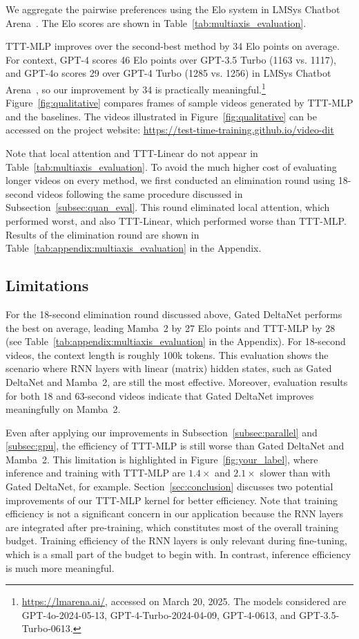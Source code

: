 We aggregate the pairwise preferences using the Elo system in LMSys Chatbot Arena~\cite{chiang2024chatbot}.
The Elo scores are shown in Table~\ref{tab:multiaxis_evaluation}.

TTT-MLP improves over the second-best method by 34 Elo points on average. 
For context, GPT-4 scores 46 Elo points over GPT-3.5 Turbo (1163 vs. 1117), and GPT-4o scores 29 over GPT-4 Turbo (1285 vs. 1256) in LMSys Chatbot Arena~\cite{chiang2024chatbot}, so our improvement by 34 is practically meaningful.\footnote{
\url{https://lmarena.ai/}, accessed on March 20, 2025. The models considered are
GPT-4o-2024-05-13,
GPT-4-Turbo-2024-04-09,
GPT-4-0613, and
GPT-3.5-Turbo-0613.
}
Figure~\ref{fig:qualitative} compares frames of sample videos generated by TTT-MLP and the baselines.
The videos illustrated in Figure~\ref{fig:qualitative} can be accessed on the project website:
\url{https://test-time-training.github.io/video-dit}

Note that local attention and TTT-Linear do not appear in Table~\ref{tab:multiaxis_evaluation}.
To avoid the much higher cost of evaluating longer videos on every method, we first conducted an elimination round using 18-second videos following the same procedure discussed in Subsection~\ref{subsec:quan_eval}.
This round eliminated local attention, which performed worst, and also TTT-Linear, which performed worse than TTT-MLP.
Results of the elimination round are shown in Table~\ref{tab:appendix:multiaxis_evaluation} in the Appendix.

\subsection{Limitations}
\label{subsec:limitations}
For the 18-second elimination round discussed above, Gated DeltaNet performs the best on average, leading Mamba~2 by 27 Elo points and TTT-MLP by 28 (see Table~\ref{tab:appendix:multiaxis_evaluation} in the Appendix).
For 18-second videos, the context length is roughly 100k tokens.
This evaluation shows the scenario where RNN layers with linear (matrix) hidden states, such as Gated DeltaNet and Mamba~2, are still the most effective.
Moreover, evaluation results for both 18 and 63-second videos indicate that Gated DeltaNet improves meaningfully on Mamba~2.

Even after applying our improvements in Subsection~\ref{subsec:parallel} and \ref{subsec:gpu}, the efficiency of TTT-MLP is still worse than Gated DeltaNet and Mamba~2.
This limitation is highlighted in Figure~\ref{fig:your_label}, where inference and training with TTT-MLP are $1.4\times$ and $2.1\times$ slower than with Gated DeltaNet, for example.
Section~\ref{sec:conclusion} discusses two potential improvements of our TTT-MLP kernel for better efficiency.
Note that training efficiency is not a significant concern in our application because the RNN layers are integrated after pre-training, which constitutes most of the overall training budget.
Training efficiency of the RNN layers is only relevant during fine-tuning, which is a small part of the budget to begin with.
In contrast, inference efficiency is much more meaningful.

